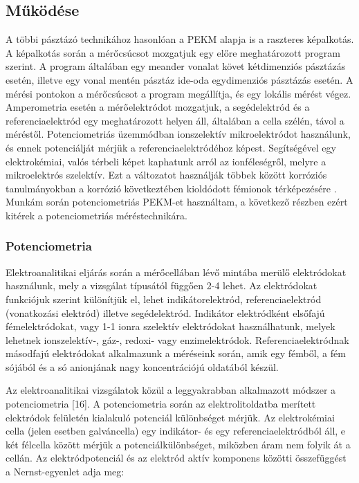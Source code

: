 \subsection{Működése}

A többi pásztázó technikához hasonlóan a PEKM alapja is a raszteres képalkotás. A képalkotás során a mérőcsúcsot mozgatjuk egy előre meghatározott program szerint. A program általában egy meander vonalat követ kétdimenziós pásztázás esetén, illetve egy vonal mentén pásztáz ide-oda egydimenziós pásztázás esetén. A mérési pontokon a mérőcsúcsot a program megállítja, és egy lokális mérést végez. Amperometria esetén a mérőelektródot mozgatjuk, a segédelektród és a referenciaelektród egy meghatározott helyen áll, általában a cella szélén, távol a méréstől. Potenciometriás üzemmódban ionszelektív mikroelektródot használunk, és ennek potenciálját mérjük a referenciaelektródéhoz képest. Segítségével egy elektrokémiai, valós térbeli képet kaphatunk arról az ionféleségről, melyre a mikroelektrós szelektív. Ezt a változatot használják többek között korróziós tanulmányokban a korrózió következtében kioldódott fémionok térképezésére \cite{bastos2010micropotentiometric, lamaka2008monitoring, karavai2010localized}. Munkám során potenciometriás PEKM-et használtam, a következő részben ezért kitérek a potenciometriás méréstechnikára.



\subsubsection{Potenciometria}

Elektroanalitikai eljárás során a mérőcellában lévő mintába merülő elektródokat használunk, mely a vizsgálat típusától függően 2-4 lehet. Az elektródokat funkciójuk szerint különítjük el, lehet indikátorelektród, referenciaelektród (vonatkozási elektród) illetve segédelektród. Indikátor elektródként elsőfajú fémelektródokat, vagy 1-1 ionra szelektív elektródokat használhatunk, melyek lehetnek ionszelektív-, gáz-, redoxi- vagy enzimelektródok. Referenciaelektródnak másodfajú elektródokat alkalmazunk a méréseink során, amik egy fémből, a fém sójából és a só anionjának nagy koncentrációjú oldatából készül.

Az elektroanalitikai vizsgálatok közül a leggyakrabban alkalmazott módszer a potenciometria [16]. A potenciometria során az elektrolitoldatba merített elektródok felületén kialakuló potenciál különbséget mérjük. Az elektrokémiai cella (jelen esetben galváncella) egy indikátor- és egy referenciaelektródból áll, e két félcella között mérjük a potenciálkülönbséget, miközben áram nem folyik át a cellán. Az elektródpotenciál és az elektród aktív komponens közötti összefüggést a Nernst-egyenlet adja meg:

